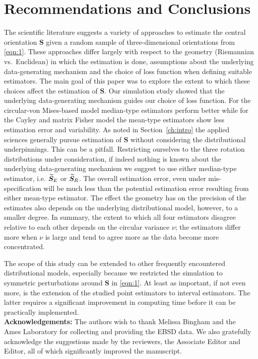 \section{Recommendations and Conclusions}\label{sec:disc}

The scientific literature suggests a variety of approaches to estimate the central orientation $\bm S$ given a random sample of three-dimensional orientations from \eqref{eqn:1}. These approaches differ largely with respect to the geometry (Riemannian vs.~Euclidean) in which the estimation is done, assumptions about the underlying data-generating mechanism and the choice of loss function when defining suitable estimators. The main goal of this paper was to explore the extent to which these choices affect the estimation of $\bm S$. 
Our simulation study showed that  the underlying data-generating mechanism guides our choice of loss function.  For the circular-von Mises-based model median-type estimators perform better while for the Cayley and matrix Fisher model the mean-type estimators show less estimation error and variability. As noted in Section~\ref{ch:intro} the applied sciences generally pursue estimation of $\bm S$ without considering the distributional underpinnings. This can be a pitfall. Restricting ourselves to the three rotation distributions under consideration,  if indeed nothing is known about the underlying data-generating mechanism we suggest to use either median-type estimator, i.e. ${\widetilde{\bm S}_E}$ or ${\widetilde{\bm S}_R}$. The overall estimation error, even under mis-specification will be much less than the potential estimation error resulting from either mean-type estimator. The effect the geometry has on the precision of the estimates also depends on the underlying distributional model, however, to a smaller degree. %
In summary, the extent to which all four estimators disagree relative to each other depends on the circular variance $\nu$; the estimators differ more when $\nu$ is large and tend to agree more as the data become more concentrated.  
   
The scope of this study can be extended to other frequently encountered distributional models, especially because we restricted the simulation to symmetric perturbations around $\bm S$ in \eqref{eqn:1}. At least as important, if not even more, is the extension of the studied point estimators to interval estimators. The latter requires a significant improvement in computing time before it can be practically implemented. \\

\noindent \textbf{Acknowledgements:} The authors wish to thank Melissa Bingham and the Ames Laboratory for collecting and providing the EBSD data. We also gratefully acknowledge the suggestions made by the reviewers, the Associate Editor and Editor, all of which significantly improved the manuscript.